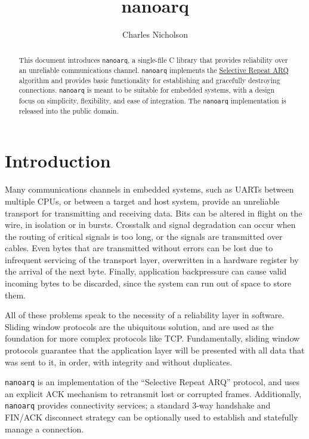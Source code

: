 \documentclass[11pt]{article}
\begin{document}
\title{nanoarq}
\author{Charles Nicholson}
\maketitle

\begin{abstract}
This document introduces \texttt{nanoarq}, a single-file C library that provides reliability over an unreliable communications channel. \texttt{nanoarq} implements the \href{https://en.wikipedia.org/wiki/Selective_Repeat_ARQ}{Selective Repeat ARQ}  algorithm and provides basic functionality for establishing and gracefully destroying connections. \texttt{nanoarq} is meant to be suitable for embedded systems, with a design focus on simplicity, flexibility, and ease of integration. The \texttt{nanoarq} implementation is released into the public domain.
\end{abstract}

\section{Introduction}
    Many communications channels in embedded systems, such as UARTs between multiple CPUs, or between a target and host system, provide an unreliable transport for transmitting and receiving data. Bits can be altered in flight on the wire, in isolation or in bursts. Crosstalk and signal degradation can occur when the routing of critical signals is too long, or the signals are transmitted over cables. Even bytes that are transmitted without errors can be lost due to infrequent servicing of the transport layer, overwritten in a hardware register by the arrival of the next byte. Finally, application backpressure can cause valid incoming bytes to be discarded, since the system can run out of space to store them. \par
    All of these problems speak to the necessity of a reliability layer in software. Sliding window protocols are the ubiquitous solution, and are used as the foundation for more complex protocols like TCP. Fundamentally, sliding window protocols guarantee that the application layer will be presented with all data that was sent to it, in order, with integrity and without duplicates. \par
    \texttt{nanoarq} is an implementation of the \enquote{Selective Repeat ARQ} protocol, and uses an explicit ACK mechanism to retransmit lost or corrupted frames. Additionally, \texttt{nanoarq} provides connectivity services; a standard 3-way handshake and FIN/ACK disconnect strategy can be optionally used to establish and statefully manage a connection.
\end{document}
